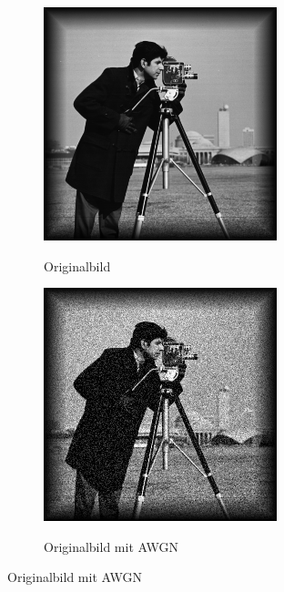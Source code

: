 \newpage
\begin{figure}[!ht]
  \centering
  \begin{subfigure}[b]{.48\linewidth}
    \caption{Originalbild}
    \includegraphics[width=\linewidth]
      {pictures/chapIntroduction/denoiseSNR15/cameraman.png}
    \label{fig:cameraman}
  \end{subfigure}
  \quad
  \begin{subfigure}[b]{.48\linewidth}
    \caption{Originalbild mit AWGN}
    \includegraphics[width=\linewidth]
      {pictures/chapIntroduction/denoiseSNR15/cameramanSNR15.png}
    \label{fig:cameramanSNR15}
  \end{subfigure}


\end{figure}
